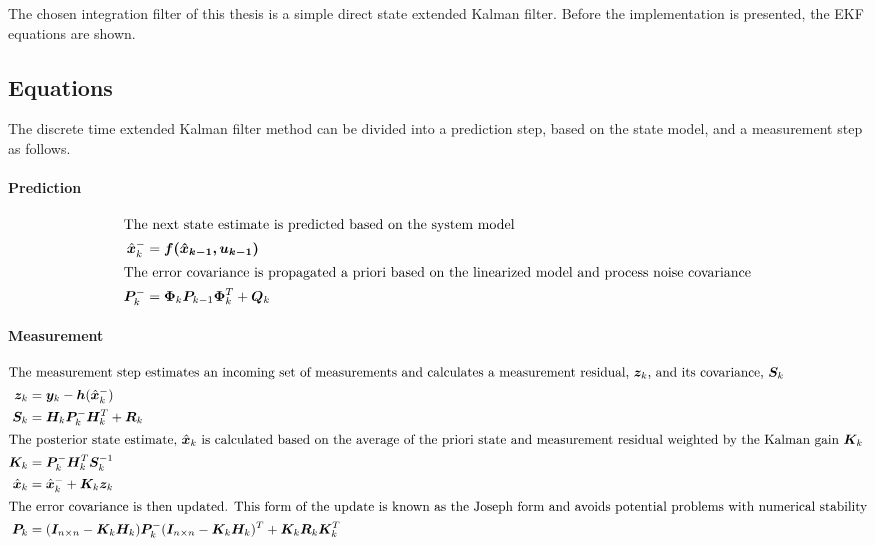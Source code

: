 The chosen integration filter of this thesis is a simple direct state extended Kalman filter. Before the implementation is presented, the EKF equations are shown.
\subsection{Equations} 
    The discrete time extended Kalman filter method can be divided into a prediction step, based on the state model, and a measurement step as follows.
    \paragraph{Prediction}
    \begin{align}
        \intertext{The next state estimate is predicted based on the system model}
        \hat{\bm{x}}_k^- &= \bm{f(\hat{\bm{x}}_{k-1}, \bm{u}_{k-1})}\\
        \intertext{The error covariance is propagated a priori based on the linearized model and process noise covariance}
        \bm{P}_k^- &= \bm{\Phi}_k\bm{P}_{k-1}\bm{\Phi}_k^T + \bm{Q}_k
    \end{align}
    
    \paragraph{Measurement}
    \begin{align}
        \intertext{The measurement step estimates an incoming set of measurements and calculates a measurement residual, $\bm{z}_k$, and its covariance, $\bm{S}_k$}
        \bm{z}_k &= \bm{y}_k - \bm{h}(\hat{\bm{x}}_k^-)\\
        \bm{S}_k &= \bm{H}_k\bm{P}_k^-\bm{H}_k^T+\bm{R}_k\\
        \intertext{The posterior state estimate, $\hat{\bm{x}}_k$ is calculated based on the average of the priori state and measurement residual weighted by the Kalman gain $\bm{K}_k$}
        \bm{K}_k &= \bm{P}_k^-\bm{H}_k^T\bm{S}_k^{-1}\\
        \hat{\bm{x}}_k     &= \hat{\bm{x}}_k^- + \bm{K}_k\bm{z}_k\\
        \intertext{The error covariance is then updated. This form of the update is known as the Joseph form and avoids potential problems with numerical stability}
        \bm{P}_k &= (\bm{I}_{n\times n} - \bm{K}_k\bm{H}_k)\bm{P}_k^-(\bm{I}_{n\times n} - \bm{K}_k\bm{H}_k)^T + \bm{K}_k\bm{R}_k\bm{K}_k^T
    \end{align}
    
